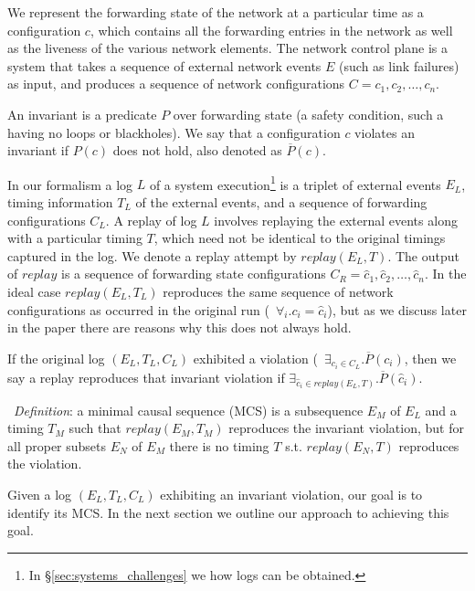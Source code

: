 We represent the forwarding state of the network
at a particular time as a configuration $c$, which contains all the forwarding
entries in the network
as well as the liveness of the various network elements.
The network control plane is a system that takes a sequence of
external network events $E$ (such as link failures) as input,
and produces a sequence of network configurations
$C = c_1,c_2,\dots,c_n$.

An invariant is a predicate $P$ over forwarding state (a safety
condition, such a having no loops or blackholes). We say that a configuration
$c$ violates an invariant if $P(c)$ does not
hold, also denoted as $\overline{P}(c)$.

In our formalism a log $L$ of a system execution\footnote{In
\S\ref{sec:systems_challenges} we how logs can be obtained.} is a triplet of external events $E_L$,
timing information $T_L$ of the external events, and a sequence of forwarding
configurations $C_L$.
A replay of log $L$ involves replaying the external events along with a
particular timing $T$,
which need not be identical to the original timings captured in the log.
We denote a replay attempt by $replay(E_L,T)$.
The output of $replay$ is a sequence of forwarding state configurations
$C_R = \hat{c}_1,\hat{c}_2,\dots,\hat{c}_n$. In the ideal case $replay(E_L,T_L)$ reproduces the same
sequence of network configurations as occurred in the original run
(\ie~$\forall_i. c_i = \hat{c}_i$), but as we discuss later in the paper there are reasons why
this does not always hold.

If the original log $(E_L, T_L, C_L)$ exhibited a violation
(\ie~$\exists_{c_i \in C_L}. \overline{P}(c_i)$,
then we say a replay reproduces that invariant violation if
$\exists_{\hat{c}_i \in replay(E_L,T)}. \overline{P}(\hat{c}_i)$.

\noindent~{\em Definition}: a minimal causal sequence (MCS) is a subsequence $E_M$
of $E_L$ and a timing $T_M$ such
that $replay(E_M,T_M)$ reproduces the invariant violation, but for all proper
subsets $E_N$ of $E_M$
there is no timing $T$ s.t. $replay(E_N,T)$ reproduces the violation.

Given a log $(E_L, T_L, C_L)$ exhibiting an invariant violation,
our goal is to identify its MCS. In the next section we outline our approach
to achieving this goal.
